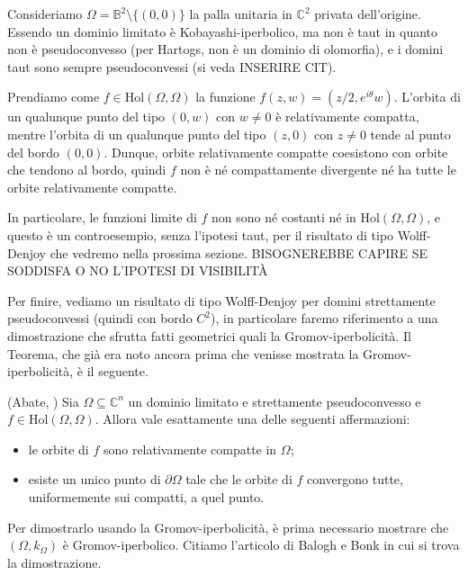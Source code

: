 \begin{ex}
    Consideriamo $\Omega=\mathbb{B}^2\setminus\{(0,0)\}$ la palla unitaria in $\mathbb{C}^2$ privata dell'origine. Essendo un dominio limitato è Kobayashi-iperbolico, ma non è taut in quanto non è pseudoconvesso (per Hartogs, non è un dominio di olomorfia), e i domini taut sono sempre pseudoconvessi (si veda INSERIRE CIT).

    Prendiamo come $f\in\text{Hol}(\Omega,\Omega)$ la funzione $f(z,w)=(z/2,e^{i\theta}w)$. L'orbita di un qualunque punto del tipo $(0,w)$ con $w\not=0$ è relativamente compatta, mentre l'orbita di un qualunque punto del tipo $(z,0)$ con $z\not=0$ tende al punto del bordo $(0,0)$. Dunque, orbite relativamente compatte coesistono con orbite che tendono al bordo, quindi $f$ non è né compattamente divergente né ha tutte le orbite relativamente compatte.
    
    In particolare, le funzioni limite di $f$ non sono né costanti né in $\text{Hol}(\Omega,\Omega)$, e questo è un controesempio, senza l'ipotesi taut, per il risultato di tipo Wolff-Denjoy che vedremo nella prossima sezione. BISOGNEREBBE CAPIRE SE SODDISFA O NO L'IPOTESI DI VISIBILITÀ
\end{ex}

Per finire, vediamo un risultato di tipo Wolff-Denjoy per domini strettamente pseudoconvessi (quindi con bordo $C^2$), in particolare faremo riferimento a una dimostrazione che sfrutta fatti geometrici quali la Gromov-iperbolicità. Il Teorema, che già era noto ancora prima che venisse mostrata la Gromov-iperbolicità, è il seguente.

\begin{thm} \label{abate_wd}
    (Abate, \cite[Theorem 0.5]{A}) Sia $\Omega \subseteq \mathbb{C}^n$ un dominio limitato e strettamente pseudoconvesso e $f \in \text{Hol}(\Omega,\Omega)$. Allora vale esattamente una delle seguenti affermazioni:
    \begin{itemize}
        \item le orbite di $f$ sono relativamente compatte in $\Omega$;
        \item esiste un unico punto di $\partial\Omega$ tale che le orbite di $f$ convergono tutte, uniformemente sui compatti, a quel punto.
    \end{itemize}
\end{thm}

Per dimostrarlo usando la Gromov-iperbolicità, è prima necessario mostrare che $(\Omega,k_{\Omega})$ è Gromov-iperbolico. Citiamo l'articolo di Balogh e Bonk in cui si trova la dimostrazione.

